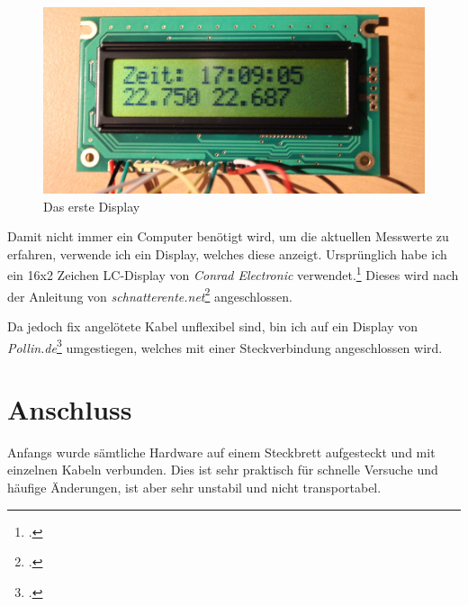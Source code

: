 \begin{figure}[h]
  \centering
     \includegraphics[width=\textwidth]{figures/erstes_display.jpg}
  \caption{Das erste Display}
  \label{fig:erstes_display}
\end{figure}

Damit nicht immer ein Computer benötigt wird, um die aktuellen Messwerte zu erfahren, verwende ich ein Display, welches diese anzeigt. Ursprünglich habe ich ein 16x2 Zeichen \gls{LC-Display} von \emph{Conrad Electronic} verwendet.\footcite{conrad_datenblatt}
Dieses wird nach der Anleitung von \emph{schnatterente.net}\footcite{schnatterente} angeschlossen.

Da jedoch fix angelötete Kabel unflexibel sind, bin ich auf ein Display von \emph{Pollin.de}\footcite{display_pollin} umgestiegen, welches mit einer Steckverbindung angeschlossen wird.

\section{Anschluss}
\label{sec:Anschluss}

Anfangs wurde sämtliche Hardware auf einem \gls{Steckbrett} aufgesteckt und mit einzelnen Kabeln verbunden. Dies ist sehr praktisch für schnelle Versuche und häufige Änderungen, ist aber sehr unstabil und nicht transportabel.

